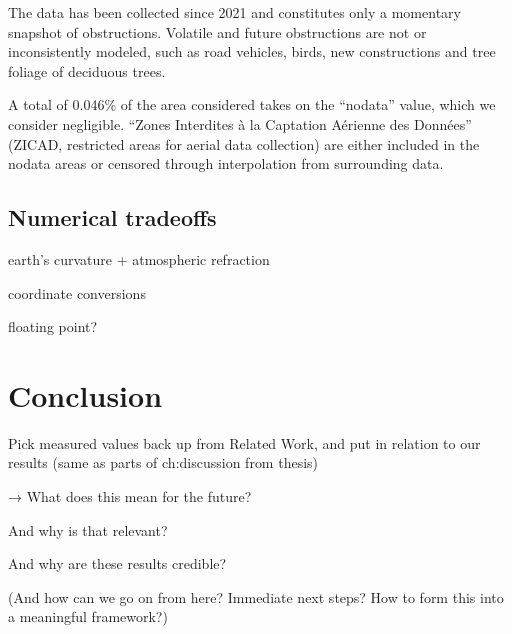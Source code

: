 \documentclass[conference]{IEEEtran}
\begin{document}
    The data has been collected since 2021 and constitutes only a momentary snapshot of obstructions.
    Volatile and future obstructions are not or inconsistently modeled, such as road vehicles, birds, new constructions and tree foliage of deciduous trees.

    A total of 0.046\% of the area considered takes on the ``nodata'' value, which we consider negligible.
    ``Zones Interdites à la Captation Aérienne des Données'' (ZICAD, restricted areas for aerial data collection) are either included in the nodata areas or censored through interpolation from surrounding data.


    \subsection{Numerical tradeoffs}\label{subsec:numerical-tradeoffs}
    earth's curvature + atmospheric refraction

    coordinate conversions

    floating point?


    \section{Conclusion}\label{sec:conclusion}
    Pick measured values back up from Related Work, and put in relation to our results (same as parts of ch:discussion from thesis)

    → What does this mean for the future?

    And why is that relevant?

    And why are these results credible?

    (And how can we go on from here? Immediate next steps? How to form this into a meaningful framework?)

    \vspace{12pt} %


    
    
\end{document}
